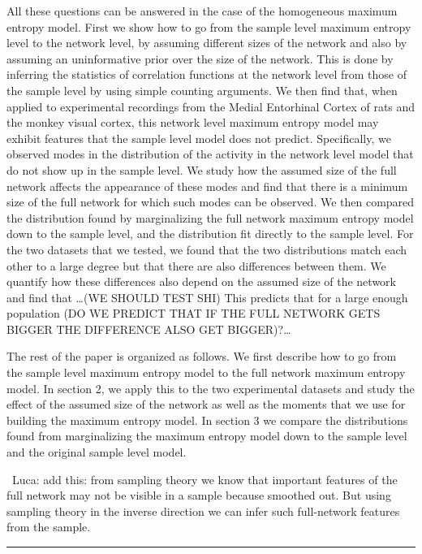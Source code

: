 \documentclass[\ifafour a4paper,12pt,\else a5paper,10pt,\fi%
onecolumn,oneside,article,%
british%
]{memoir}
\theoremstyle{remark}
\theoremstyle{innote}
\renewcommand*{\|}{\nonscript\,\vert\nonscript\;\mathopen{}}
\newcommand*{\puzzle}{{\fontencoding{U}\fontfamily{fontawesometwo}\selectfont\symbol{225}}}
\newcommand{\mynote}[1]{ {\color{notecolour}\puzzle\ #1}}
\begin{document}
{All these questions can be answered in the case of the homogeneous maximum
entropy model. First we show how to go from the sample level maximum
entropy level to the network level, by assuming different sizes of the
network and also by assuming an uninformative prior over the size of the
network. This is done by inferring the statistics of correlation functions
at the network level from those of the sample level by using simple
counting arguments. We then find that, when applied to experimental
recordings from the Medial Entorhinal Cortex of rats and the monkey visual
cortex, this network level maximum entropy model may exhibit features that
the sample level model does not predict. Specifically, we observed modes in
the distribution of the activity in the network level model that do not
show up in the sample level. We study how the assumed size of the full
network affects the appearance of these modes and find that there is a
minimum size of the full network for which such modes can be observed. We
then compared the distribution found by marginalizing the full network
maximum entropy model down to the sample level, and the distribution fit
directly to the sample level. For the two datasets that we tested, we found
that the two distributions match each other to a large degree but that
there are also differences between them. We quantify how these differences
also depend on the assumed size of the network and find that …(WE SHOULD
TEST SHI) This predicts that for a large enough population (DO WE PREDICT
THAT IF THE FULL NETWORK GETS BIGGER THE DIFFERENCE ALSO GET BIGGER)?…

The rest of the paper is organized as follows. We first describe how to go
from the sample level maximum entropy model to the full network maximum
entropy model. In section 2, we apply this to the two experimental datasets
and study the effect of the assumed size of the network as well as the
moments that we use for building the maximum entropy model. In section 3 we
compare the distributions found from marginalizing the maximum entropy
model down to the sample level and the original sample level model.

}
\mynote{Luca: add this: from sampling theory we know that important
  features of the full network may not be visible in a sample because
  smoothed out. But using sampling theory in the inverse direction we can
  infer such full-network features from the sample.}


\hrule
\bigskip
\end{document}
